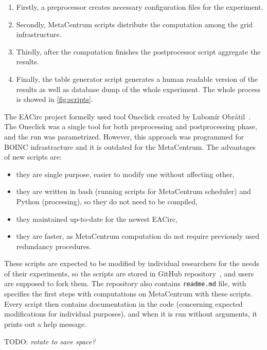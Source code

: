 \documentclass[
  print, %
  Table,   %
  nolof,     %
  nolot,     %
  11pt, %
  oneside  %
]{fithesis3}
\newcommand{\todo}[1]{TODO: \textit{#1}}
\begin{document}
\begin{enumerate}[noitemsep,topsep=3pt,parsep=3pt,partopsep=3pt]
 \item Firstly, a preprocessor creates necessary configuration files for the experiment.
 \item Secondly, MetaCentrum scripts distribute the computation among the grid infrastructure.
 \item Thirdly, after the computation finishes the postprocessor script aggregate the results. 
 \item Finally, the table generator script generates a human readable version of the results as well as database dump of the whole experiment. The whole process is showed in \cref{fig:scripts}.
\end{enumerate}

The EACirc project formelly used tool Oneclick created by Lubomír Obrátil~\cite{obratilBcThesis}. The Oneclick was a single tool for both preprocessing and postprocessing phase, and the run was parametrized. However, this approach was programmed for BOINC infrastracture and it is outdated for the MetaCentrum. The advantages of new scripts are: 

\begin{itemize}
    \item they are single purpose, easier to modify one without affecting other,
    \item they are written in bash (running scripts for MetaCentrum scheduler) and Python (processing), so they do not need to be compiled,
    \item they maintained up-to-date for the newest EACirc,
    \item they are faster, as MetaCentrum computation do not require previously used redundancy procedures.
\end{itemize}

These scripts are expected to be modified by individual researchers for the needs of their experiments, so the scripts are stored in GitHub repository~\cite{eaUtils}, and users are supposed to fork them. The repository also contains \texttt{readme.md} file, with specifies the first steps with computations on MetaCentrum with these scripts. Every script then contains documentation in the code (concerning expected modifications for individual purposes), and when it is run without arguments, it prints out a help message.

\todo{rotate to save space?}
\end{document}
